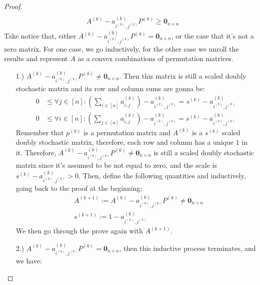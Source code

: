 \documentclass[]{article}
\theoremstyle{definition}
\begin{document}
\begin{proof}
\begin{align}
                \\
                & A^{(k)} - a^{(k)}_{i^{(k)}, j^{(k)}}P^{(k)} \ge \mathbf 0_{n\times n}
            \end{align}
            Take notice that, either $A^{(k)} - a^{(k)}_{i^{(k)}, j^{(k)}}P^{(k)} = \mathbf 0_{n\times n}$, or the case that it's not a zero matrix. For one case, we go inductively, for the other case we unroll the results and represent $A$ as a convex combinations of permutation matrices. 
            \begin{itemize}
                \item [1.)] $A^{(k)} - a^{(k)}_{i^{(k)}, j^{(k)}}P^{(k)} \neq \mathbf 0_{n\times n}$. Then this matrix is still a scaled doubly stochastic matrix and its row and column sums are gonna be: 
                \begin{align}
                    0 & \le\forall j \in [n]: 
                        \left(
                            \sum_{i \in [n]}^{} 
                            a^{(k)}_{i, j}
                        \right) - a^{(k)}_{i^{(k)}, j^{(k)}} 
                        = s^{(k)} - a^{(k)}_{i^{(k)}, j^{(k)}} 
                        \\
                    0 & \le \forall i \in [n]: 
                    \left(
                        \sum_{j \in [n]}^{} 
                        a^{(k)}_{i, j}
                    \right) - a^{(k)}_{i^{(k)}, j^{(k)}} 
                    = s^{(k)} - a^{(k)}_{i^{(k)}, j^{(k)}} 
                \end{align}
                Remember that $p^{(k)}$ is a permutation matrix and $A^{(k)}$ is a $s^{(k)}$ scaled doubly stochastic matrix, therefore, each row and column has a unique $1$ in it. Therefore, $A^{(k)} - a^{(k)}_{i^{(k)}, j^{(k)}}P^{(k)} \neq \mathbf 0_{n\times n}$ is still a scaled doubly stochastic matrix since it's assumed to be not equal to zero, and the scale is $s^{(k)} - a^{(k)}_{i^{(k)}, j^{(k)}}> 0$. Then, define the following quantities and inductively, going back to the proof at the beginning: 
                \begin{align}
                    & 
                    A^{(k + 1)}:= A^{(k)} - a^{(k)}_{i^{(k)}, j^{(k)}}P^{(k)} \neq \mathbf 0_{n\times n}
                    \\
                    & s^{(k + 1)} := 1 - a^{(k)}_{i^{(k)}, j^{(k)}}
                \end{align}
                We then go through the prove again with $A^{(k + 1)}$. 
                \item [2.)] $A^{(k)} - a^{(k)}_{i^{(k)}, j^{(k)}}P^{(k)} = \mathbf 0_{n\times n}$, then this inductive process terminates, and we have: 

\end{itemize}
\end{proof}
\end{document}
